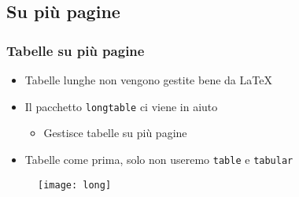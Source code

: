 \subsection{Su più pagine}
\begin{frame}
 \frametitle{Tabelle su più pagine}

 \begin{itemize}
  \item Tabelle lunghe non vengono gestite bene da \LaTeX
  \item Il pacchetto \texttt{longtable} ci viene in aiuto
  \begin{itemize}
   \item Gestisce tabelle su più pagine
  \end{itemize}

  \item Tabelle come prima, solo non useremo \texttt{table} e \texttt{tabular}
 \end{itemize}
 
 
 \begin{figure}[H]
  \centering
  \texttt{[image: long]}
 \end{figure}

\end{frame}
